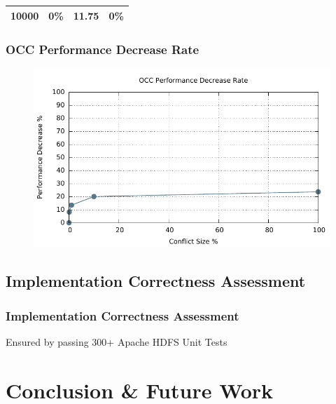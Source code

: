 \documentclass{beamer}
\begin{document}
\begin{frame}
\begin{table}[ht]
\begin{tabular}{|c|c|c|c|}
			10000                                                                                                          & 0\%                                                               & 11.75                                                                     & 0\%                                                                                               \\ \hline
		\end{tabular}
	\end{table}
\end{frame}
\begin{frame}
	\frametitle{OCC Performance Decrease Rate}
	\begin{figure}[ht]
		\centering
		\includegraphics[width=\linewidth]{figs/conRate.pdf}
	\end{figure}
\end{frame}

\subsection{Implementation Correctness Assessment}
\begin{frame}
	\frametitle{Implementation Correctness Assessment}
	Ensured by passing 300+ Apache HDFS Unit Tests
\end{frame}

\section{Conclusion \& Future Work}
\end{document}
